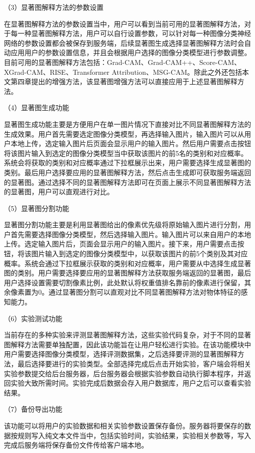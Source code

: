 （3）显著图解释方法的参数设置
 
在显著图解释方法的参数设置当中，用户可以看到当前可用的显著图解释方法，对于每一种显著图解释方法，用户可以自行设置参数，可以针对每一种图像分类神经网络的参数设置都会被保存到服务端，后续显著图生成选择显著图解释方法时会自动应用用户的参数设置信息，并且会根据用户选择的图像分类模型进行参数调整。目前可用的显著图解释方法包括：Grad-CAM、Grad-CAM++、Score-CAM、XGrad-CAM、RISE、Transformer Attribution、MSG-CAM。除此之外还包括本文第四章提出的增强方法，该显著图增强方法可以直接应用于上述显著图解释方法。

（4）显著图生成功能

显著图生成功能主要是方便用户在单一图片情况下直接对比不同显著图解释方法的生成效果。用户首先需要选定图像分类模型，再选择输入图片，输入图片可以从用户本地上传，选定输入图片后页面会显示用户的输入图片。然后用户需要点击按钮将该图片输入到选定的图像分类模型当中获取该图片的前5名的类别和对应概率。系统会将获取的类别和对应概率通过下拉框展示出来，用户需要选择生成显著图的类别。最后用户选择要应用的显著图解释方法，然后点击生成即可获取服务端返回的显著图。通过选择不同的显著图解释方法即可在页面上展示不同显著图解释方法的显著图，用户可以直观进行对比。

（5）显著图分割功能

显著图分割功能主要是利用显著图给出的像素优先级将原始输入图片进行分割，用户首先需要选择图像分类模型，然后选择输入图片。输入图片可以来自用户的本地上传。选定输入图片后，页面会显示用户的输入图片。接下来，用户需要点击按钮，将该图片输入到选定的图像分类模型中，以获取该图片的前5个类别及其对应概率。系统会通过下拉框展示获取的类别和对应概率，用户需要从中选择生成显著图的类别。用户需要选择要应用的显著图解释方法获取服务端返回的显著图，最后用户选择设置需要切割像素比例，此处默认将权重值排名靠前的像素进行保留，其余像素置为0。通过显著图分割可以直观对比不同显著图解释方法对物体特征的感知能力。

（6）实验测试功能

当前存在的多种实验来评测显著图解释方法，这些实验代码复杂，对于不同的显著图解释方法需要单独配置，因此该功能旨在让用户轻松进行实验。在该功能模块中用户需要选择图像分类模型，选择评测数据集，之后选择要评测的显著图解释方法，最后选择要进行的实验类型。全部选择完成后点击开始实验，客户端会将相关实验参数提交给后台服务器，后台服务器会根据实验参数自动执行脚本程序，并返回实验大致所需时间。实验完成后数据会存入用户数据库，用户之后可以查看实验结果。

（7）备份导出功能

该功能可以将用户的实验数据和相关实验参数设置保存备份。服务器将要保存的数据按规则写入纯文本文件当中，包括实验时间，实验结果，实验相关参数等，写入完成后服务端将保存备份文件传给客户端本地。

